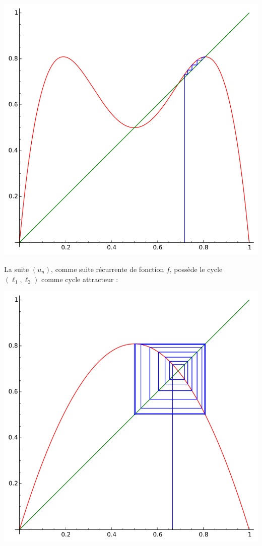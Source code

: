 \documentclass[class=report,crop=false]{standalone}
\begin{document}
\begin{enumerate}
\begin{enumerate}
\begin{center}
  \includegraphics[scale=0.3]{figures/chaos8}
  \end{center}
  
  La suite $(u_n)$, comme suite récurrente de fonction $f$, possède 
  le cycle $(\ell_1,\ell_2)$ comme cycle attracteur :
  \begin{center}
  \includegraphics[scale=0.4]{figures/chaos9}
  \end{center}
  \end{enumerate} 
  

\end{enumerate}
\end{document}
